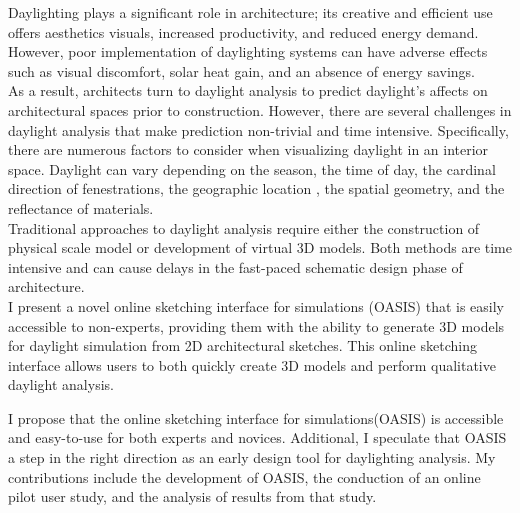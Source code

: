 Daylighting plays a significant role in architecture; its creative and efficient use offers aesthetics visuals, increased productivity, and reduced energy demand. However, poor implementation of daylighting systems can have adverse effects such as visual discomfort, solar heat gain, and an absence of energy savings. \\

As a result, architects turn to daylight analysis to predict daylight's affects on architectural spaces prior to construction. However, there are several challenges in daylight analysis that make prediction non-trivial and time intensive. Specifically, there are numerous factors to consider when visualizing daylight in an interior space. Daylight can vary depending on the season, the time of day, the cardinal direction of fenestrations, the geographic location , the spatial geometry, and the reflectance of materials. \\

Traditional approaches to daylight analysis require either the construction of physical scale model or development of virtual 3D models. Both methods are time intensive and can cause delays in the fast-paced schematic design phase of architecture. \\

I present a novel online sketching interface for simulations (OASIS) that is easily accessible to non-experts, providing them with the ability to generate 3D models for daylight simulation from 2D architectural sketches. 
This online sketching interface allows users to both quickly create 3D models and perform qualitative  daylight analysis.

I propose that the online sketching interface for simulations(OASIS) is accessible and easy-to-use for both experts and novices.
Additional, I speculate that OASIS a step in the right direction as an early design tool for daylighting analysis.
My contributions include the development of OASIS, the conduction of an online pilot user study, and the analysis of results from that study. \\
